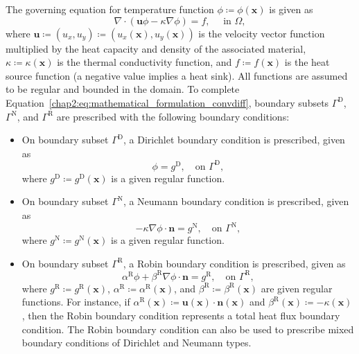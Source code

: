 The governing equation for temperature function $\phi\coloneqq\phi\left(\bm{x}\right)$ is given as
\begin{equation}
\nabla\cdot\left(\bm{u}\phi-\kappa\nabla\phi\right)=f,\quad\text{ in }\Omega,
\label{chap2:eq:mathematical_formulation_convdiff}
\end{equation}
where $\bm{u}\coloneqq\left(u_{x},u_{y}\right)\coloneqq\left(u_{x}\left(\bm{x}\right),u_{y}\left(\bm{x}\right)\right)$ is the velocity vector function multiplied by the heat capacity and density of the associated material, $\kappa\coloneqq\kappa\left(\bm{x}\right)$ is the thermal conductivity function, and $f\coloneqq f\left(\bm{x}\right)$ is the heat source function (a negative value implies a heat sink).
All functions are assumed to be regular and bounded in the domain.
To complete Equation~\cref{chap2:eq:mathematical_formulation_convdiff}, boundary subsets $\Gamma^{\textrm{D}}$, $\Gamma^{\textrm{N}}$, and $\Gamma^{\textrm{R}}$ are prescribed with the following boundary conditions:
\begin{itemize}
\item On boundary subset $\Gamma^{\textrm{D}}$, a Dirichlet boundary condition is prescribed, given as
\begin{equation}
\label{chap2:eq:mathematical_formulation_dirichlet}
\phi=g^{\textrm{D}},\quad\text{on }\Gamma^{\textrm{D}},
\end{equation}
where $g^{\textrm{D}}\coloneqq g^{\textrm{D}}\left(\bm{x}\right)$ is a given regular function.
\item On boundary subset $\Gamma^{\textrm{N}}$, a Neumann boundary condition is prescribed, given as
\begin{equation}
\label{chap2:eq:mathematical_formulation_neumann}
-\kappa\nabla\phi\cdot\bm{n}=g^{\textrm{N}},\quad\text{on }\Gamma^{\textrm{N}},
\end{equation}
where $g^{\textrm{N}}\coloneqq g^{\textrm{N}}\left(\bm{x}\right)$ is a given regular function.
\item On boundary subset $\Gamma^{\textrm{R}}$, a Robin boundary condition is prescribed, given as
\begin{equation}
\label{chap2:eq:mathematical_formulation_robin}
\alpha^{\textrm{R}}\phi+\beta^{\textrm{R}}\nabla\phi\cdot\bm{n}=g^{\textrm{R}},\quad\text{on }\Gamma^{\textrm{R}},
\end{equation}
where $g^{\textrm{R}}\coloneqq g^{\textrm{R}}\left(\bm{x}\right)$, $\alpha^{\textrm{R}}\coloneqq\alpha^{\textrm{R}}\left(\bm{x}\right)$, and $\beta^{\textrm{R}}\coloneqq\beta^{\textrm{R}}\left(\bm{x}\right)$ are given regular functions.
For instance, if $\alpha^{\textrm{R}}\left(\bm{x}\right)\coloneqq\bm{u}\left(\bm{x}\right)\cdot\bm{n}\left(\bm{x}\right)$ and $\beta^{\textrm{R}}\left(\bm{x}\right)\coloneqq-\kappa\left(\bm{x}\right)$, then the Robin boundary condition represents a total heat flux boundary condition.
The Robin boundary condition can also be used to prescribe mixed boundary conditions of Dirichlet and Neumann types.
\end{itemize}

